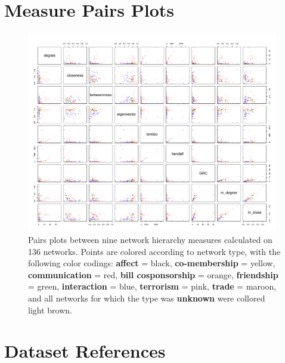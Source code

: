 \documentclass[3p,times]{elsarticle}
\begin{document}


\newpage
\appendix


\section{Measure Pairs Plots}
\label{sec:pairs plots}

\begin{figure}[htp]
\begin{center}
	\caption{\label{fig:pairs plots} Pairs plots between nine network hierarchy measures calculated on 136 networks. Points are colored according to network type, with the following color codings: \textbf{affect} = black,         \textbf{co-membership} = yellow,  \textbf{communication} = red, \textbf{bill cosponsorship} = orange, \textbf{friendship} = green,  \textbf{interaction} = blue, \textbf{terrorism} = pink, \textbf{trade} = maroon, and all networks for which the type was \textbf{unknown} were collored light brown.}
		\includegraphics[width = 0.98\textwidth]{./images/Global_Measure_Pairs_Plots.pdf}
\end{center}
\end{figure}


\section{Dataset References}
\label{sec:dataset references}
\end{document}
